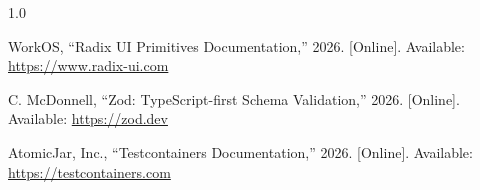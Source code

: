 \documentclass[12pt,oneside]{book}
\begin{document}
\begin{spacing}{1.0}
\begin{enumerate}[label={[\arabic*]}, leftmargin=2.2em, itemsep=6pt]
\item\label{ref19} WorkOS, ``Radix UI Primitives Documentation,'' 2026. [Online]. Available: \url{https://www.radix-ui.com}

\item\label{ref20} C. McDonnell, ``Zod: TypeScript-first Schema Validation,'' 2026. [Online]. Available: \url{https://zod.dev}

\item\label{ref21} AtomicJar, Inc., ``Testcontainers Documentation,'' 2026. [Online]. Available: \url{https://testcontainers.com}

\end{enumerate}
\end{spacing}
\end{document}
